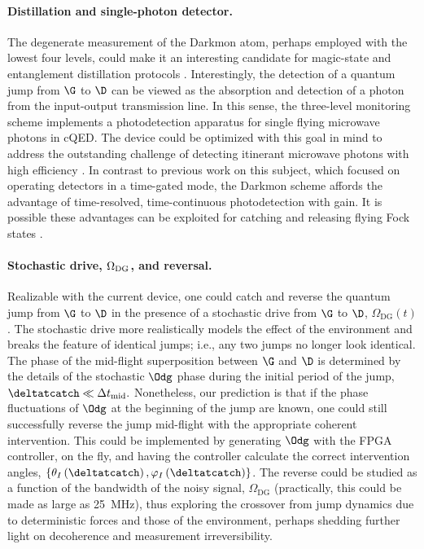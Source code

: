 \paragraph{Distillation and single-photon detector. }

The degenerate measurement of the Darkmon atom, perhaps employed
with the lowest four levels, could make it an interesting candidate
for magic-state and entanglement distillation protocols \citep{Bennett1996,Bravyi2005}.
Interestingly, the detection of a quantum jump from $\G$ to $\D$
can be viewed as the absorption and detection of a photon from the
input-output transmission line. In this sense, the three-level monitoring
scheme implements a photodetection apparatus for single flying microwave
photons in cQED. The device could be optimized with this goal in mind
to address the outstanding challenge of detecting itinerant microwave
photons with high efficiency \citep{Chen2011-FlyingPhoton,Fan2014-photonFly,Inomata2016-FlyingPhoton,Narla2016}.
In contrast to previous work on this subject, which focused on operating
detectors in a time-gated mode, the Darkmon scheme affords the advantage
of time-resolved, time-continuous photodetection with gain. It is
possible these advantages can be exploited for catching and releasing
flying Fock states \citep{Kalb2017,Campagne2017-entangle2}.


\paragraph{Stochastic drive, $\Omega_{{\rm DG}}$, and reversal. }

Realizable with the current device, one could catch and reverse the
quantum jump from $\G$ to $\D$ in the presence of a stochastic drive
from $\G$ to $\D$, $\Omega_{\mathrm{DG}}\left(t\right)$. The stochastic
drive more realistically models the effect of the environment and
breaks the feature of identical jumps; i.e., any two jumps no longer
look identical. The phase of the mid-flight superposition between
$\G$ and $\D$ is determined by the details of the stochastic $\Odg$
phase during the initial period of the jump, $\deltatcatch\ll\Delta t_{\mathrm{mid}}.$
Nonetheless, our prediction is that if the phase fluctuations of $\Odg$
at the beginning of the jump are known, one could still successfully
reverse the jump mid-flight with the appropriate coherent intervention.
This could be implemented by generating $\Odg$ with the FPGA controller,
on the fly, and having the controller calculate the correct intervention
angles, $\left\{ \theta_{I}\left(\deltatcatch\right),\varphi_{I}\left(\deltatcatch\right)\right\} $.
The reverse could be studied as a function of the bandwidth of the
noisy signal, $\Omega_{\mathrm{DG}}$ (practically, this could be
made as large as 25~MHz), thus exploring the crossover from jump
dynamics due to deterministic forces and those of the environment,
perhaps shedding further light on decoherence and measurement irreversibility.

